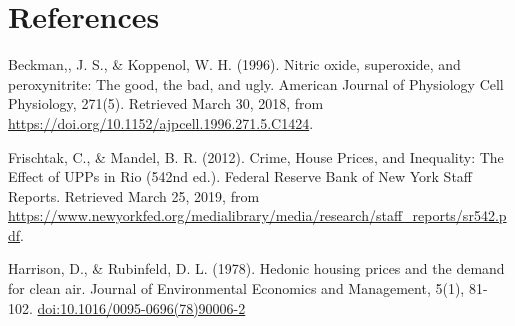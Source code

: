 \documentclass[]{article}
\begin{document}
\section{References}\label{references}

Beckman,, J. S., \& Koppenol, W. H. (1996). Nitric oxide, superoxide,
and peroxynitrite: The good, the bad, and ugly. American Journal of
Physiology Cell Physiology, 271(5). Retrieved March 30, 2018, from
\url{https://doi.org/10.1152/ajpcell.1996.271.5.C1424}.

Frischtak, C., \& Mandel, B. R. (2012). Crime, House Prices, and
Inequality: The Effect of UPPs in Rio (542nd ed.). Federal Reserve Bank
of New York Staff Reports. Retrieved March 25, 2019, from
\url{https://www.newyorkfed.org/medialibrary/media/research/staff_reports/sr542.pdf}.

Harrison, D., \& Rubinfeld, D. L. (1978). Hedonic housing prices and the
demand for clean air. Journal of Environmental Economics and Management,
5(1), 81-102. \url{doi:10.1016/0095-0696(78)90006-2}
\end{document}
